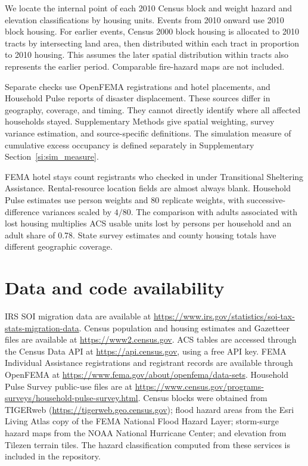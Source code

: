 \documentclass[11pt]{article}
\begin{document}
We locate the internal point of each 2010 Census block and weight hazard and elevation classifications by housing units. Events from 2010 onward use 2010 block housing. For earlier events, Census 2000 block housing is allocated to 2010 tracts by intersecting land area, then distributed within each tract in proportion to 2010 housing. This assumes the later spatial distribution within tracts also represents the earlier period. Comparable fire-hazard maps are not included.

Separate checks use OpenFEMA registrations and hotel placements, and Household Pulse reports of disaster displacement. These sources differ in geography, coverage, and timing. They cannot directly identify where all affected households stayed. Supplementary Methods give spatial weighting, survey variance estimation, and source-specific definitions. The simulation measure of cumulative excess occupancy is defined separately in Supplementary Section~\ref{si:sim_measure}.

FEMA hotel stays count registrants who checked in under Transitional Sheltering Assistance. Rental-resource location fields are almost always blank. Household Pulse estimates use person weights and 80 replicate weights, with successive-difference variances scaled by $4/80$. The comparison with adults associated with lost housing multiplies ACS usable units lost by persons per household and an adult share of 0.78. State survey estimates and county housing totals have different geographic coverage.

\section*{Data and code availability}\label{sec:availability}
IRS SOI migration data are available at \url{https://www.irs.gov/statistics/soi-tax-stats-migration-data}. Census population and housing estimates and Gazetteer files are available at \url{https://www2.census.gov}. ACS tables are accessed through the Census Data API at \url{https://api.census.gov}, using a free API key. FEMA Individual Assistance registrations and registrant records are available through OpenFEMA at \url{https://www.fema.gov/about/openfema/data-sets}. Household Pulse Survey public-use files are at \url{https://www.census.gov/programs-surveys/household-pulse-survey.html}. Census blocks were obtained from TIGERweb (\url{https://tigerweb.geo.census.gov}); flood hazard areas from the Esri Living Atlas copy of the FEMA National Flood Hazard Layer; storm-surge hazard maps from the NOAA National Hurricane Center; and elevation from Tilezen terrain tiles. The hazard classification computed from these services is included in the repository.
\end{document}
